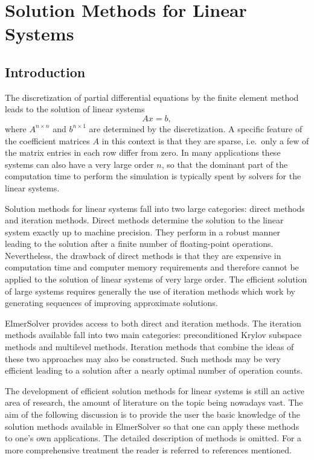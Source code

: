 \chapter{Solution Methods for Linear Systems}
\noindent


\section{Introduction}

The discretization of partial differential equations by the finite element method
leads to the solution of linear systems 
\begin{equation}\label{ModelLinearSystem}
Ax = b,
\end{equation}
where $A^{n \times n}$ and $b^{n \times 1}$ are determined by the discretization.
A specific feature of the coefficient matrices $A$
in this context is that they are sparse, 
i.e.\ only a few of the matrix entries in each row differ from zero.
In many applications these systems can also have a very large order $n$, so that the 
dominant part of the computation time to perform the simulation is typically spent 
by solvers for the linear systems. 

Solution methods for linear systems fall into two large categories: direct methods
and iteration methods. Direct methods determine the solution to the linear system 
exactly up to machine precision. They perform in a robust manner leading to the
solution after a finite number of floating-point operations. Nevertheless,
the drawback of direct methods is that they are expensive 
in computation time and computer memory requirements and therefore cannot be applied
to the solution of linear systems of very large order. The efficient solution of large 
systems requires generally the use of iteration methods which work by generating sequences
of improving approximate solutions. 

ElmerSolver provides access to both direct and iteration methods.
The iteration methods available fall into two main categories: preconditioned
Krylov subspace methods and multilevel methods. Iteration methods that
combine the ideas of these two approaches may also be constructed. 
Such methods may be very efficient leading to a solution after a nearly
optimal number of operation counts.               

The development of efficient solution methods for linear systems is still an active area 
of research, the amount of literature on the topic being nowadays vast.   
The aim of the following discussion is to provide the user the basic knowledge of 
the solution methods available in ElmerSolver so that one can apply these
methods to one's own applications. The detailed description of methods
is omitted. For a more comprehensive treatment the reader is referred to references
mentioned.    

